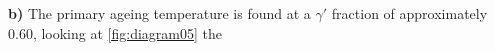 \textbf{b)} The primary ageing temperature is found at a $\gamma'$ fraction of approximately 0.60, looking at \ref{fig:diagram05} the 





